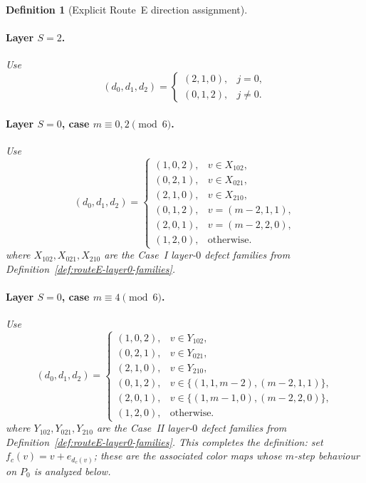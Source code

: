 \documentclass[11pt]{article}
\newtheorem{definition}{Definition}
\begin{document}
\begin{definition}[Explicit Route~E direction assignment]
\paragraph{Layer $S=2$.}
Use
\[
(d_0,d_1,d_2)=
\begin{cases}
(2,1,0), & j=0,\\
(0,1,2), & j\ne 0.
\end{cases}
\]

\paragraph{Layer $S=0$, case $m\equiv 0,2\pmod 6$.}
Use
\[
(d_0,d_1,d_2)=
\begin{cases}
(1,0,2), & v\in X_{102},\\
(0,2,1), & v\in X_{021},\\
(2,1,0), & v\in X_{210},\\
(0,1,2), & v=(m-2,1,1),\\
(2,0,1), & v=(m-2,2,0),\\
(1,2,0), & \text{otherwise.}
\end{cases}
\]
\smallskip\noindent
where $X_{102},X_{021},X_{210}$ are the Case~I layer-$0$ defect families from Definition~\ref{def:routeE-layer0-families}.

\paragraph{Layer $S=0$, case $m\equiv 4\pmod 6$.}
Use
\[
(d_0,d_1,d_2)=
\begin{cases}
(1,0,2), & v\in Y_{102},\\
(0,2,1), & v\in Y_{021},\\
(2,1,0), & v\in Y_{210},\\
(0,1,2), & v\in\{(1,1,m-2),(m-2,1,1)\},\\
(2,0,1), & v\in\{(1,m-1,0),(m-2,2,0)\},\\
(1,2,0), & \text{otherwise.}
\end{cases}
\]
where $Y_{102},Y_{021},Y_{210}$ are the Case~II layer-$0$ defect families from Definition~\ref{def:routeE-layer0-families}.
This completes the definition: set $f_c(v)=v+e_{d_c(v)}$; these are the associated color maps whose $m$-step behaviour on $P_0$ is analyzed below.
\end{definition}
\end{document}
